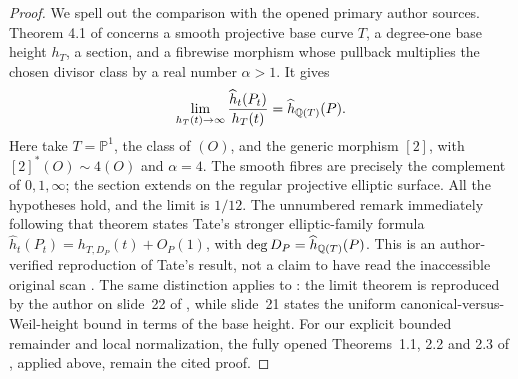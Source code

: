 \begin{proof}
We spell out the comparison with the opened primary author sources.
Theorem 4.1 of \citet[pp.~183--184]{callSilverman1993} concerns a
smooth projective base curve $T$, a degree-one base height $h_T$,
a section, and a fibrewise morphism whose pullback multiplies the
chosen divisor class by a real number $\alpha>1$. It gives
\[
 \lim_{h_T(t)\to\infty}
 \frac{\widehat h_t(P_t)}{h_T(t)}
       =\widehat h_{\mathbb Q(T)}(P).
\]
Here take $T=\mathbb P^1$, the class of $(O)$, and the generic
morphism $[2]$, with $[2]^*(O)\sim4(O)$ and $\alpha=4$.
The smooth fibres are precisely the complement of $0,1,\infty$;
the section extends on the regular projective elliptic surface.
All the hypotheses hold, and the limit is $1/12$.
The unnumbered remark immediately following that theorem states
Tate's stronger elliptic-family formula
$\widehat h_t(P_t)=h_{T,D_P}(t)+O_P(1)$, with
$\deg D_P=\widehat h_{\mathbb Q(T)}(P)$. This is an author-verified
reproduction of Tate's result, not a claim to have read the
inaccessible original scan \citep{tate1983variation}.
The same distinction applies to \citet{silverman1983specialization}:
the limit theorem is reproduced by the author on slide~22 of
\citet{silverman2006heights}, while slide~21 states the uniform
canonical-versus-Weil-height bound in terms of the base height.
For our explicit bounded remainder and local normalization, the
fully opened Theorems~1.1, 2.2 and 2.3 of
\citet{demarco2017}, applied above, remain the cited proof.
\end{proof}

